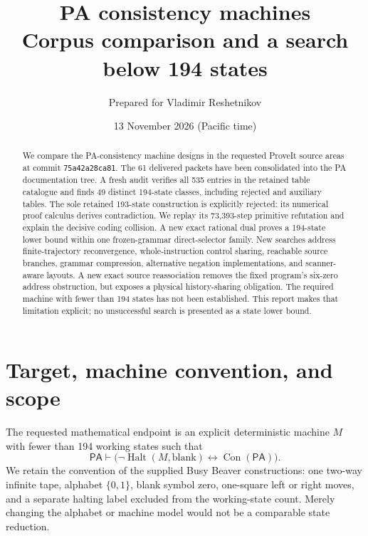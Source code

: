\documentclass[11pt]{article}
\title{\color{navy}PA consistency machines\\[4pt]\large Corpus comparison and a search below 194 states}
\author{Prepared for Vladimir Reshetnikov}
\date{13 November 2026 (Pacific time)}
\newcommand{\PA}{\mathsf{PA}}
\newcommand{\Con}{\operatorname{Con}}
\newcommand{\Halt}{\operatorname{Halt}}
\begin{document}
\maketitle
\begin{abstract}
We compare the PA-consistency machine designs in the requested ProveIt source areas at commit \texttt{75a42a28ca81}. The 61 delivered packets have been consolidated into the PA documentation tree. A fresh audit verifies all 535 entries in the retained table catalogue and finds 49 distinct 194-state classes, including rejected and auxiliary tables. The sole retained 193-state construction is explicitly rejected: its numerical proof calculus derives contradiction. We replay its 73,393-step primitive refutation and explain the decisive coding collision. A new exact rational dual proves a 194-state lower bound within one frozen-grammar direct-selector family. New searches address finite-trajectory reconvergence, whole-instruction control sharing, reachable source branches, grammar compression, alternative negation implementations, and scanner-aware layouts. A new exact source reassociation removes the fixed program's six-zero address obstruction, but exposes a physical history-sharing obligation. The required machine with fewer than 194 states has not been established. This report makes that limitation explicit; no unsuccessful search is presented as a state lower bound.
\end{abstract}
\vspace{3pt}
\noindent{}
\setcounter{tocdepth}{1}
\tableofcontents
\newpage

\section{Target, machine convention, and scope}
The requested mathematical endpoint is an explicit deterministic machine $M$ with fewer than 194 working states such that
\begin{equation}\label{eq:goal}
 \PA\vdash\bigl(\neg\Halt(M,\mathrm{blank})\leftrightarrow\Con(\PA)\bigr).
\end{equation}
We retain the convention of the supplied Busy Beaver constructions: one two-way infinite tape, alphabet $\{0,1\}$, blank symbol zero, one-square left or right moves, and a separate halting label excluded from the working-state count. Merely changing the alphabet or machine model would not be a comparable state reduction.
\end{document}
